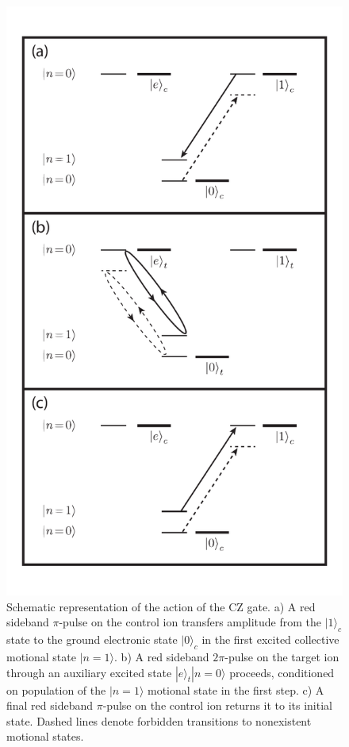 \documentclass[%
12pt,
 amsmath,amssymb,
]{revtex4-2}
\begin{document}
\begin{figure}
\includegraphics[scale=0.7]{CZ_lettered.pdf}
\caption{Schematic representation of the action of the CZ gate.  a) A red sideband $\pi$-pulse on the control ion transfers amplitude from the $|1\rangle_{c}$  state to the ground electronic state $|0\rangle_{c}$ in the first excited collective motional state $|n=1\rangle$. b) A red sideband $2\pi$-pulse on the target ion through an auxiliary excited state $|e\rangle_{t}|n=0\rangle$ proceeds, conditioned on population of the $|n=1\rangle$ motional state in the first step. c) A final red sideband $\pi$-pulse on the control ion returns it to its initial state. Dashed lines denote forbidden transitions to nonexistent motional states.}
\label{CZFigure}
\end{figure}
\end{document}
